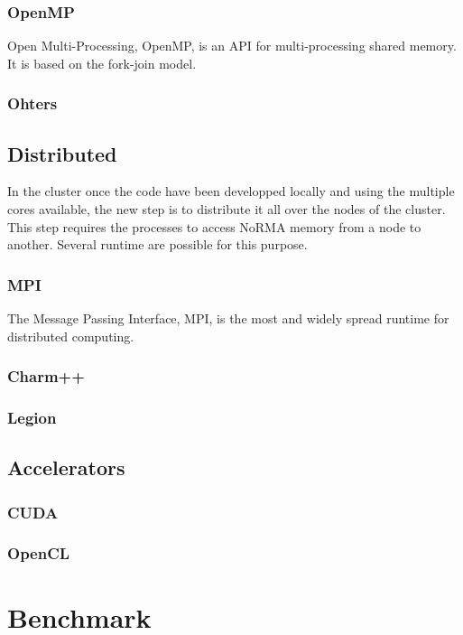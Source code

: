\subsubsection{OpenMP}
Open Multi-Processing, OpenMP, is an API for multi-processing shared memory. 
It is based on the fork-join model.
\cite{chapman2008using,supinski2017scaling}

\subsubsection{Ohters}

\subsection{Distributed}
In the cluster once the code have been developped locally and using the multiple cores available, the new step is to distribute it all over the nodes of the cluster. 
This step requires the processes to access NoRMA memory from a node to another. 
Several runtime are possible for this purpose.

\subsubsection{MPI}
The Message Passing Interface, MPI, is the most and widely spread runtime for distributed computing.
\cite{gropp2014using,gropp2015using}

\subsubsection{Charm++}
\subsubsection{Legion}

\subsection{Accelerators}
\subsubsection{CUDA}
\subsubsection{OpenCL}


\section{Benchmark}


